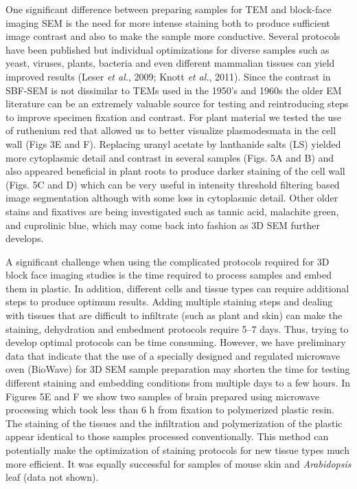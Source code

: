 \documentclass{article}
\begin{document}
One significant difference between preparing samples for TEM and block-face imaging SEM is the need for more intense staining both to produce sufficient image contrast and also to make the sample more conductive. Several protocols have been published but individual optimizations for diverse samples such as yeast, viruses, plants, bacteria and even different mammalian tissues can yield improved results (Leser \textit{et al.}, 2009; Knott \textit{et al.}, 2011). Since the contrast in SBF-SEM is not dissimilar to TEMs used in the 1950’s and 1960s the older EM literature can be an extremely valuable source for testing and reintroducing steps to improve specimen fixation and contrast. For plant material we tested the use of ruthenium red that allowed us to better visualize plasmodesmata in the cell wall (Figs 3E and F). Replacing uranyl acetate by lanthanide salts (LS) yielded more cytoplasmic detail and contrast in several samples (Figs. 5A and B) and also appeared beneficial in plant roots to produce darker staining of the cell wall (Figs. 5C and D) which can be very useful in intensity threshold filtering based image segmentation although with some loss in cytoplasmic detail. Other older stains and fixatives are being investigated such as tannic acid, malachite green, and cuprolinic blue, which may come back into fashion as 3D SEM further develops.

A significant challenge when using the complicated protocols required for 3D block face imaging studies is the time required to process samples and embed them in plastic. In addition, different cells and tissue types can require additional steps to produce optimum results. Adding multiple staining steps and dealing with tissues that are difficult to infiltrate (such as plant and skin) can make the staining, dehydration and embedment protocols require 5–7 days. Thus, trying to develop optimal protocols can be time consuming. However, we have preliminary data that indicate that the use of a specially designed and regulated microwave oven (BioWave) for 3D SEM sample preparation may shorten the time for testing different staining and embedding conditions from multiple days to a few hours. In Figures 5E and F we show two samples of brain prepared using microwave processing which took less than 6 h from fixation to polymerized plastic resin. The staining of the tissues and the infiltration and polymerization of the plastic appear identical to those samples processed conventionally. This method can potentially make the optimization of staining protocols for new tissue types much more efficient. It was equally successful for samples of mouse skin and \textit{Arabidopsis} leaf (data not shown).
\end{document}
